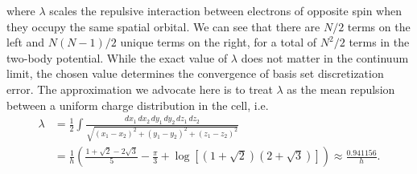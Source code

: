 \documentclass[superscriptaddress,aps,pra,nofootinbib,notitlepage,10pt,longbibliography]{revtex4-1}
\begin{document}
where $\lambda$ scales the repulsive interaction between electrons of opposite spin when they occupy the same spatial orbital. We can see that there are $N / 2$ terms on the left and $N (N - 1) / 2$ unique terms on the right, for a total of $N^2 / 2$ terms in the two-body potential. While the exact value of $\lambda$ does not matter in the continuum limit, the chosen value determines the convergence of basis set discretization error. The approximation we advocate here is to treat $\lambda$ as the mean repulsion between a uniform charge distribution in the cell, i.e.
\begin{align}
\lambda & =  \frac{1}{2} \int \frac{dx_1 \, dx_2 \, dy_1 \, dy_2 \, dz_1 \, dz_2 }{\sqrt{\left(x_1 - x_2 \right)^2 + \left(y_1 - y_2\right)^2 + \left(z_1 - z_2\right)^2}} \\
%
& = \frac{1}{h} \left(\frac{1 + \sqrt{2} - 2 \sqrt{3}}{5} - \frac{\pi}{3} + \log \left[\left(1 + \sqrt{2}\right)\left(2 + \sqrt{3}\right)\right]\right)
%
\approx \frac{0.941156}{h}.\nonumber
\end{align}
\end{document}
